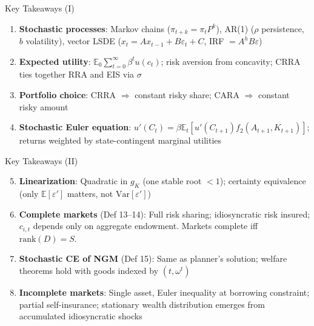 \documentclass[blue]{beamer}
\newcommand{\E}{\mathbb{E}}
\begin{document}
\begin{frame}{Key Takeaways (I)}
	\begin{enumerate}
		\item \textbf{Stochastic processes}: Markov chains ($\pi_{t+k} = \pi_t P^k$), AR(1) ($\rho$ persistence, $b$ volatility), vector LSDE ($x_t = Ax_{t-1} + B\varepsilon_t + C$, IRF $= A^h B\varepsilon$)
		
		\item \textbf{Expected utility}: $\E_0 \sum_{t=0}^{\infty} \beta^t u(c_t)$; risk aversion from concavity; CRRA ties together RRA and EIS via $\sigma$
		
		\item \textbf{Portfolio choice}: CRRA $\Rightarrow$ constant risky share; CARA $\Rightarrow$ constant risky amount
		
		\item \textbf{Stochastic Euler equation}: $u'(C_t) = \beta \E_t[u'(C_{t+1}) f_2(A_{t+1}, K_{t+1})]$; returns weighted by state-contingent marginal utilities
	\end{enumerate}
\end{frame}

\begin{frame}{Key Takeaways (II)}
	\begin{enumerate}
		\setcounter{enumi}{4}
		\item \textbf{Linearization}: Quadratic in $g_K$ (one stable root $< 1$); certainty equivalence (only $\E[\varepsilon']$ matters, not $\text{Var}[\varepsilon']$)
		
		\item \textbf{Complete markets} (Def 13--14): Full risk sharing; idiosyncratic risk insured; $c_{i,t}$ depends only on aggregate endowment. Markets complete iff $\text{rank}(D) = S$.
		
		\item \textbf{Stochastic CE of NGM} (Def 15): Same as planner's solution; welfare theorems hold with goods indexed by $(t, \omega^t)$
		
		\item \textbf{Incomplete markets}: Single asset, Euler inequality at borrowing constraint; partial self-insurance; stationary wealth distribution emerges from accumulated idiosyncratic shocks
	\end{enumerate}
\end{frame}
\end{document}
